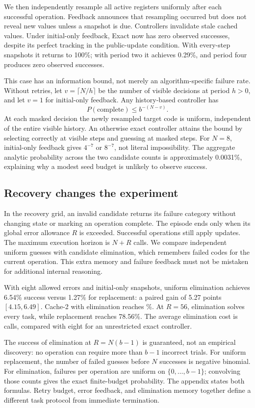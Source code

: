 \documentclass[sigconf,nonacm]{acmart}
\begin{document}
We then independently resample all active registers uniformly after each
successful operation. Feedback announces that resampling occurred but
does not reveal new values unless a snapshot is due. Controllers
invalidate stale cached values. Under initial-only feedback, Exact now
has zero observed successes, despite its perfect tracking in the public-update
condition. With every-step snapshots it returns to 100\%; with period two
it achieves 0.29\%, and period four produces zero observed successes.

This case has an information bound, not merely an algorithm-specific
failure rate. Without retries, let $v=\lceil N/h\rceil$ be the number of
visible decisions at period $h>0$, and let $v=1$ for initial-only feedback.
Any history-based controller has
\[
 P(\text{complete})\le b^{-(N-v)}.
\]
At each masked decision the newly resampled target code is uniform,
independent of the entire visible history. An otherwise exact controller
attains the bound by selecting correctly at visible steps and guessing at
masked steps. For $N=8$, initial-only feedback gives $4^{-7}$ or $8^{-7}$,
not literal impossibility. The aggregate analytic probability across the
two candidate counts is approximately 0.0031\%, explaining why a modest
seed budget is unlikely to observe success.

\subsection{Recovery changes the experiment}
In the recovery grid, an invalid candidate returns its failure category
without changing state or marking an operation complete. The episode ends
only when its global error allowance $R$ is exceeded. Successful operations
still apply updates. The maximum execution horizon is $N+R$ calls.
We compare independent uniform guesses with candidate elimination, which
remembers failed codes for the current operation. This extra memory and
failure feedback must not be mistaken for additional internal reasoning.

With eight allowed errors and initial-only snapshots, uniform elimination
achieves 6.54\% success versus 1.27\% for replacement: a paired gain of
5.27 points $[4.15,6.49]$. Cache-2 with elimination reaches
\CacheRecoverySuccess{}\%. At $R=56$, elimination solves every task,
while replacement reaches 78.56\%. The average elimination cost is
\EliminateCalls{} calls, compared with eight for an unrestricted exact
controller.

The success of elimination at $R=N(b-1)$ is guaranteed, not an empirical
discovery: no operation can require more than $b-1$ incorrect trials.
For uniform replacement, the number of failed guesses before $N$ successes
is negative binomial. For elimination, failures per operation are uniform
on $\{0,\ldots,b-1\}$; convolving those counts gives the exact finite-budget
probability. The appendix states both formulas. Retry budget, error feedback,
and elimination memory together define a different task protocol from
immediate termination.
\end{document}
